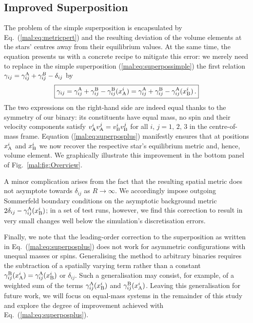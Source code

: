 \subsection{Improved Superposition} \label{mal:sec:improvedsuperposition}
%
The problem of the simple superposition is encapsulated
by Eq.~(\ref{mal:eq:metricpert}) and the resulting deviation
of the volume elements at the stars' centres away from their
equilibrium values. At the same time, the equation presents us
with a concrete recipe to mitigate this error: we merely need
to replace in the simple superposition (\ref{mal:eq:superpossimple})
the first relation $\gamma_{ij}=\gamma_{ij}^{\rm A}+\gamma_{ij}^B
-\delta_{ij}$ by
%
\begin{equation}
  \boxed{
  \gamma_{ij}=\gamma_{ij}^{\rm A}+\gamma_{ij}^{\rm B}
  -\gamma_{ij}^{\rm B}(x^i_{\rm A})
  =\gamma_{ij}^{\rm A}+\gamma_{ij}^{\rm B}
  -\gamma_{ij}^{\rm A}(x^i_{\rm B})\,.}
  \label{mal:eq:superposplus}
\end{equation}
%
The two expressions on the right-hand side are indeed equal thanks
to the symmetry of our binary: its constituents have equal mass,
no spin and their velocity components satisfy
$v_{\rm A}^i v_{\rm A}^j=v_{\rm B}^i v_{\rm B}^j$ for all
$i,\,j=1,\,2,\,3$ in the centre-of-mass frame.
Equation (\ref{mal:eq:superposplus}) manifestly ensures that at
positions $x_{\rm A}^i$ and $x_{\rm B}^i$ we now recover
the respective star's equilibrium metric and, hence, volume element.
We graphically illustrate this improvement in the bottom panel
of Fig.~\ref{mal:fig:Overview}.

A minor complication arises from the fact that the resulting
spatial metric does not asymptote towards $\delta_{ij}$
as $R\rightarrow \infty$. We accordingly impose
outgoing Sommerfeld boundary conditions on the asymptotic
background metric $2\delta_{ij}-\gamma_{ij}^{\rm A}(x^i_{\rm B})$;
in a set of test runs, however, we find this correction to result
in very small changes well below the simulation's discretisation errors.

Finally, we note that the leading-order correction to the superposition
as written in Eq.~(\ref{mal:eq:superposplus}) does not work for asymmetric
configurations with unequal masses or spins. Generalising the method
to arbitrary binaries requires the subtraction of 
a spatially varying term rather than a constant
$\gamma_{ij}^{\rm B}(x^i_{\rm A})=\gamma_{ij}^{\rm A}(x^i_{\rm B})$
or $\delta_{ij}$. Such a generalisation may consist, for example,
of a weighted sum of the terms $\gamma_{ij}^{\rm A}(x^i_{\rm B})$
and $\gamma_{ij}^{\rm B}(x^i_{\rm A})$. Leaving this
generalisation for future work, we will focus on equal-mass
systems in the remainder of this study and explore
the degree of improvement achieved with
Eq.~(\ref{mal:eq:superposplus}).

